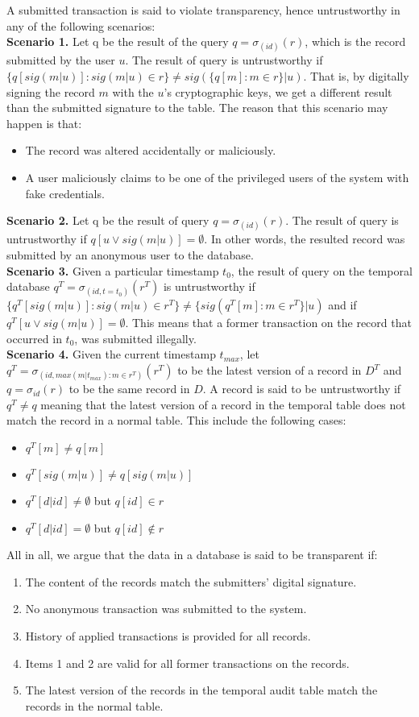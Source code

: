 A submitted transaction is said to violate transparency, hence untrustworthy in any of the following scenarios:\\
\textbf{Scenario 1.} Let q be the result of the query $q=\sigma_{(id)}(r)$, which is the record submitted by the user $u$. The result of query is untrustworthy if $\{q[sig(m|u)]: sig(m|u) \in r\} \neq sig(\{q[m]: m \in r \} |u)$. That is, by digitally signing the record $m$ with the $u$'s cryptographic keys, we get a different result than the submitted signature to the table. The reason that this scenario may happen is that: 
\begin{itemize}
	\item  The record was altered accidentally or maliciously.
	\item  A user maliciously claims to be one of the privileged users of the system with fake credentials.
\end{itemize} 
\textbf{Scenario 2.} Let q be the result of query $q=\sigma_{(id)}(r)$. The result of query is untrustworthy if $q[u \vee sig(m|u)] = \emptyset$. In other words, the resulted record was submitted by an anonymous user to the database.\\
\textbf{Scenario 3.} Given a particular timestamp $t_0$, the result of query on the temporal database  $q^T=\sigma_{(id,t=t_0)}(r^T)$ is untrustworthy if $\{q^T[sig(m|u)]: sig(m|u) \in r^T\} \neq \{sig(q^T[m]:m \in r^T\}|u)$ and if $q^T[u \vee sig(m|u)] = \emptyset$. This means that a former transaction on the record that occurred in $t_0$, was submitted illegally. \\
\textbf{Scenario 4.} Given the current timestamp $t_{max}$, let $q^T = \sigma _{(id,max(m|t_{max}): m \in r^T)}(r^T)$ to be the latest version of a record in $D^T$ and $q=\sigma_{id}(r)$ to be the same record in $D$. A record is said to be untrustworthy if $q^T \neq q$ meaning that the latest version of a record in the temporal table does not match the record in a normal table. This include the following cases:
\begin{itemize}
	\item $q^T[m] \neq q[m]$
	\item $q^T[sig(m|u)] \neq q[sig(m|u)]$
	\item $q^T[d|id] \neq \emptyset$ but $q[id] \in r$
	\item $q^T[d|id] = \emptyset$ but $q[id] \notin r$
\end{itemize}


All in all, we argue that the data in a database is said to be transparent if:
\begin{enumerate}
	\item The content of the records match the submitters' digital signature.
	\item No anonymous transaction was submitted to the system.
	\item History of applied transactions is provided for all records. 
	\item Items 1 and 2 are valid for all former transactions on the records.
	\item The latest version of the records in the temporal audit table match the records in the normal table.
\end{enumerate}
